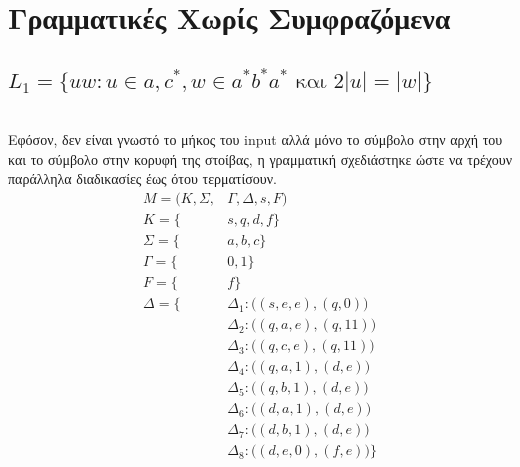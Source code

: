 \section{Γραμματικές Χωρίς Συμφραζόμενα}

\subsection{$L_1 = \{uw : u \in{a, c}^*, w \in a^*b^*a^* \text{ και } 2|u| = |w| \}$}

\noindent\\
Εφόσον, δεν είναι γνωστό το μήκος του input αλλά μόνο το σύμβολο στην αρχή του και το σύμβολο στην κορυφή της στοίβας, η γραμματική σχεδιάστηκε ώστε να τρέχουν παράλληλα διαδικασίες έως ότου τερματίσουν.
\begin{align*}
M = (Κ, Σ,& Γ, Δ, s, F)\\
			K = \{&s, q, d, f\}\\
			Σ = \{&a, b, c\}\\
			Γ = \{&0, 1\}\\
			F  = \{&f\}\\
			Δ = \{& Δ_1 : \big(  (s, e, e), (q, 0) \big)\\
				  	 & Δ_2 : \big(  (q, a, e), (q, 11) \big)\\
				 	 & Δ_3 : \big(  (q, c, e), (q, 11) \big)\\
				 	 & Δ_4 : \big(  (q, a, 1), (d, e) \big)\\
				 	 & Δ_5 : \big(  (q, b, 1), (d, e) \big)\\
				 	 & Δ_6 : \big(  (d, a, 1), (d, e) \big)\\
				 	 & Δ_7 : \big(  (d, b, 1), (d, e) \big)\\
					 & Δ_8 : \big(  (d, e, 0), (f, e) \big)\}
\end{align*}

